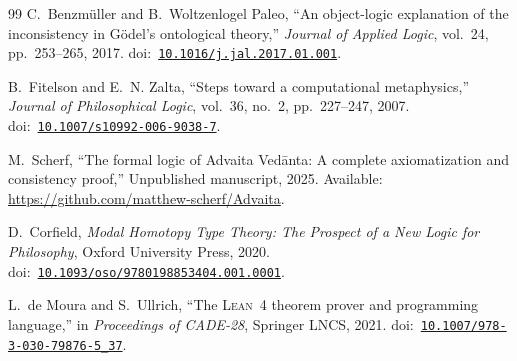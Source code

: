 \documentclass[10pt, letterpaper]{article}
\theoremstyle{definition}
\theoremstyle{remark}
\begin{document}
\begin{thebibliography}{99}
C.~Benzm\"uller and B.~Woltzenlogel Paleo,
``An object-logic explanation of the inconsistency in G\"odel's
ontological theory,''
\emph{Journal of Applied Logic}, vol.~24, pp.~253--265, 2017.
\newline doi:~\href{https://doi.org/10.1016/j.jal.2017.01.001}{\texttt{10.1016/j.jal.2017.01.001}}.

B.~Fitelson and E.~N. Zalta,
``Steps toward a computational metaphysics,''
\emph{Journal of Philosophical Logic}, vol.~36, no.~2,
pp.~227--247, 2007.
\newline doi:~\href{https://doi.org/10.1007/s10992-006-9038-7}{\texttt{10.1007/s10992-006-9038-7}}.

M.~Scherf,
``The formal logic of Advaita Ved\=anta: A complete
axiomatization and consistency proof,''
Unpublished manuscript, 2025.
Available: \url{https://github.com/matthew-scherf/Advaita}.

D.~Corfield,
\emph{Modal Homotopy Type Theory: The Prospect of a New Logic
for Philosophy},
Oxford University Press, 2020.
\newline doi:~\href{https://doi.org/10.1093/oso/9780198853404.001.0001}{\texttt{10.1093/oso/9780198853404.001.0001}}.

L.~de Moura and S.~Ullrich,
``The \textsc{Lean}~4 theorem prover and programming language,''
in \emph{Proceedings of CADE-28}, Springer LNCS, 2021.
\newline doi:~\href{https://doi.org/10.1007/978-3-030-79876-5_37}{\texttt{10.1007/978-3-030-79876-5\_37}}.

\end{thebibliography}
\end{document}
